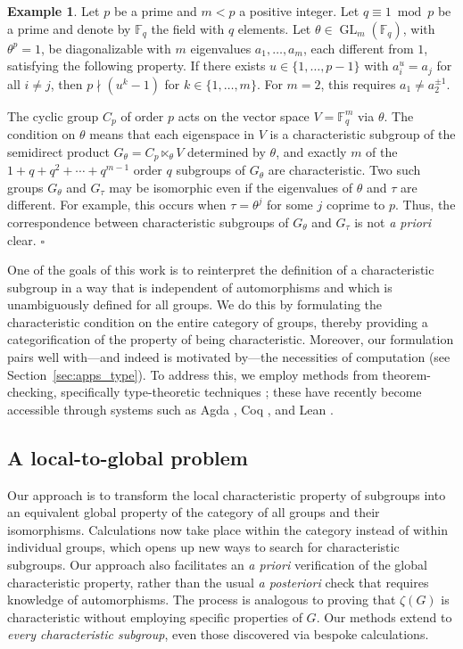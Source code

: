 \documentclass{amsart}
\numberwithin{lstfloat}{section}
\DeclareMathOperator{\GL}{GL}
\newcommand{\exqed}{\hfill $\square$}
\theoremstyle{definition}
\newtheorem{ex}[thm]{Example}
\theoremstyle{remark}
\numberwithin{equation}{section}
\begin{document}
\begin{ex}
  \label{ex:Rottlaender}
  Let $p$ be a prime and $m<p$ a positive integer. Let $q\equiv 1\bmod{p}$ be a
  prime and denote by $\mathbb{F}_q$ the field with $q$ elements. Let
  $\theta\in\GL_m(\mathbb{F}_q)$, with $\theta^p=1$, be diagonalizable with $m$
  eigenvalues $a_1,\ldots,a_m$, each different from $1$, 
satisfying the following
  property. If there exists $u\in \{1,\dots, p-1\}$ with $a_i^u=a_j$ for all $i\neq
  j$, then $p\nmid(u^k-1)$ for $k\in \{1,\dots, m\}$. 
For $m=2$, this requires $a_1\ne a_2^{\pm 1}$.
  
  The cyclic group $C_p$ of order $p$ acts on the vector space
  $V=\mathbb{F}_q^m$ via $\theta$. The condition on $\theta$ means that each eigenspace
  in $V$ is a characteristic subgroup of the semidirect product
$G_\theta=C_p\ltimes_\theta V$ determined by $\theta$, and
exactly $m$ of the $1+q+q^2+\cdots+q^{m-1}$ order $q$ subgroups of $G_\theta$ 
are characteristic. Two such groups $G_\theta$ and $G_\tau$ may be
  isomorphic even if the eigenvalues of $\theta$ and $\tau$ are different. For
  example, this occurs when $\tau=\theta^j$ for some $j$ coprime to $p$. 
Thus, the correspondence between characteristic subgroups of 
$G_\theta$ and $G_\tau$ is not {\em a priori} clear. 
\exqed
\end{ex}

One of the goals of this work is to reinterpret the definition of a
characteristic subgroup in a way that is independent of automorphisms and which
is unambiguously defined for all groups.  We do this by formulating the
characteristic condition on the entire category of groups, thereby providing a
categorification of the property of being characteristic. Moreover, our
formulation pairs well with---and indeed is motivated by---the necessities of
computation (see Section~\ref{sec:apps_type}). To address this, we employ 
methods from theorem-checking, specifically type-theoretic
techniques \cite{Hindley-Seldin,Pierce:types,HoTT}; these have recently become
accessible through systems such as Agda \cite{Agda}, Coq \cite{Coq}, and Lean
\cite{lean}.

\subsection{A local-to-global problem}
\label{sec:local-to-global}
Our approach is to transform the local characteristic property of subgroups into
an equivalent global property of the category of all groups and their
isomorphisms. Calculations now take place within the category instead of within
individual groups, which opens up new ways to search for characteristic
subgroups. Our approach also facilitates an {\it a priori} verification of the
global characteristic property, rather than the usual {\it a posteriori} check
that requires knowledge of automorphisms. The process is analogous to proving
that $\zeta(G)$ is characteristic without employing specific properties of $G$.
Our methods extend 
to \textit{every characteristic subgroup},
even those discovered via bespoke calculations.
\end{document}
